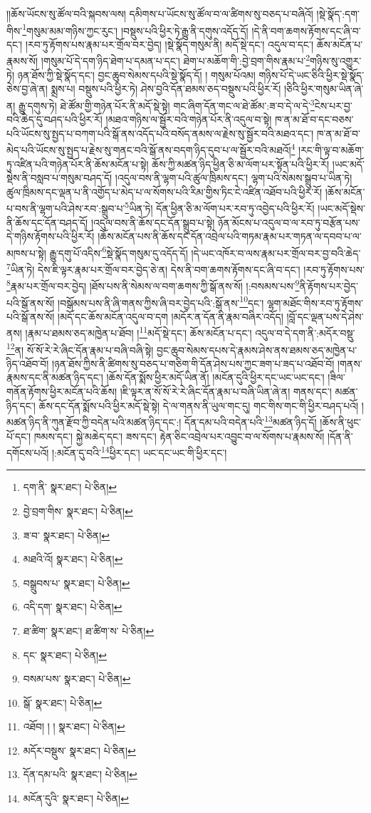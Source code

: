 །།ཆོས་ཡོངས་སུ་ཚོལ་བའི་སྐབས་ལས། དམིགས་པ་ཡོངས་སུ་ཚོལ་བ་ལ་ཚིགས་སུ་བཅད་པ་བཞིའོ། །སྡེ་སྣོད་:དག་གིས་\footnote{དག་ནི་  སྣར་ཐང་།  པེ་ཅིན། }གསུམ་མམ་གཉིས་ཀྱང་རུང་། །བསྡུས་པའི་ཕྱིར་ཏེ་རྒྱུ་ནི་དགུས་འདོད་དོ། །དེ་ནི་བག་ཆགས་རྟོགས་དང་ཞི་བ་དང་། །རབ་ཏུ་རྟོགས་པས་རྣམ་པར་གྲོལ་བར་བྱེད། །སྡེ་སྣོད་གསུམ་ནི། མདོ་སྡེ་དང་། འདུལ་བ་དང་། ཆོས་མངོན་པ་རྣམས་སོ། །གསུམ་པོ་དེ་དག་ཉིད་ཐེག་པ་དམན་པ་དང་། ཐེག་པ་མཆོག་གི་:བྱེ་བྲག་གིས་རྣམ་པ་\footnote{བྱེ་བྲག་གིས་  སྣར་ཐང་།  པེ་ཅིན། }གཉིས་སུ་འགྱུར་ཏེ། ཉན་ཐོས་ཀྱི་སྡེ་སྣོད་དང་། བྱང་ཆུབ་སེམས་དཔའི་སྡེ་སྣོད་དོ། །
གསུམ་པོའམ། གཉིས་པོ་དེ་ཡང་ཅིའི་ཕྱིར་སྡེ་སྣོད་ཅེས་བྱ་ཞེ་ན། སྨྲས་པ། བསྡུས་པའི་ཕྱིར་ཏེ། ཤེས་བྱའི་དོན་ཐམས་ཅད་བསྡུས་པའི་ཕྱིར་རོ། །ཅིའི་ཕྱིར་གསུམ་ཡིན་ཞེ་ན། རྒྱུ་དགུས་ཏེ། ཐེ་ཚོམ་གྱི་གཉེན་པོར་ནི་མདོ་སྡེ་སྟེ། གང་ཞིག་དོན་གང་ལ་ཐེ་ཚོམ་:ཟ་བ་དེ་ལ་དེ་\footnote{ཟ་བ་  སྣར་ཐང་།  པེ་ཅིན། }ངེས་པར་བྱ་བའི་ཆེད་དུ་བཤད་པའི་ཕྱིར་རོ། །མཐའ་གཉིས་ལ་སྦྱོར་བའི་གཉེན་པོར་ནི་འདུལ་བ་སྟེ། ཁ་ན་མ་ཐོ་བ་དང་བཅས་པའི་ཡོངས་སུ་སྤྱད་པ་བཀག་པའི་སྒོ་ནས་འདོད་པའི་བསོད་ནམས་ལ་རྗེས་སུ་སྦྱོར་བའི་མཐའ་དང་། ཁ་ན་མ་ཐོ་བ་མེད་པའི་ཡོངས་སུ་སྤྱད་པ་རྗེས་སུ་གནང་བའི་སྒོ་ནས་བདག་ཉིད་དུབ་པ་ལ་སྦྱོར་བའི་མཐའོ།\footnote{མཐའི་འོ།  སྣར་ཐང་།  པེ་ཅིན། } །རང་གི་ལྟ་བ་མཆོག་ཏུ་འཛིན་པའི་གཉེན་པོར་ནི་ཆོས་མངོན་པ་སྟེ། ཆོས་ཀྱི་མཚན་ཉིད་ཕྱིན་ཅི་མ་ལོག་པར་སྟོན་པའི་ཕྱིར་རོ། །ཡང་མདོ་སྡེས་ནི་བསླབ་པ་གསུམ་བཤད་དོ། །འདུལ་བས་ནི་ལྷག་པའི་ཚུལ་ཁྲིམས་དང་། ལྷག་པའི་སེམས་སྒྲུབ་པ་ཡིན་ཏེ། ཚུལ་ཁྲིམས་དང་ལྡན་པ་ནི་འགྱོད་པ་མེད་པ་ལ་སོགས་པའི་རིམ་གྱིས་ཏིང་ངེ་འཛིན་འཐོབ་པའི་ཕྱིར་རོ། །ཆོས་མངོན་པ་བས་ནི་ལྷག་པའི་ཤེས་རབ་:སྒྲུབ་པ་\footnote{བསྒྲུབས་པ་  སྣར་ཐང་།  པེ་ཅིན། }ཡིན་ཏེ། དོན་ཕྱིན་ཅི་མ་ལོག་པར་རབ་ཏུ་འབྱེད་པའི་ཕྱིར་རོ། །ཡང་མདོ་སྡེས་ནི་ཆོས་དང་དོན་བཤད་དོ། །འདུལ་བས་ནི་ཆོས་དང་དོན་སྒྲུབ་པ་སྟེ། ཉོན་མོངས་པ་འདུལ་བ་ལ་རབ་ཏུ་བརྩོན་པས་དེ་གཉིས་རྟོགས་པའི་ཕྱིར་རོ། །ཆོས་མངོན་པས་ནི་ཆོས་དང་དོན་འབྲེལ་པའི་གཏམ་རྣམ་པར་གཏན་ལ་དབབ་པ་ལ་མཁས་པ་སྟེ། རྒྱུ་དགུ་པོ་འདིས་\footnote{འདི་དག་  སྣར་ཐང་།  པེ་ཅིན། }སྡེ་སྣོད་གསུམ་དུ་འདོད་དོ། །དེ་ཡང་འཁོར་བ་ལས་རྣམ་པར་གྲོལ་བར་བྱ་བའི་ཆེད་\footnote{ཐ་ཚིག་  སྣར་ཐང་། ཐ་ཚིག་ས་  པེ་ཅིན། }ཡིན་ཏེ། དེས་ཇི་ལྟར་རྣམ་པར་གྲོལ་བར་བྱེད་ཅེ་ན། དེས་ནི་བག་ཆགས་རྟོགས་དང་ཞི་བ་དང་། །རབ་ཏུ་རྟོགས་པས་\footnote{དང་  སྣར་ཐང་།  པེ་ཅིན། }རྣམ་པར་གྲོལ་བར་བྱེད། །ཐོས་པས་ནི་སེམས་ལ་བག་ཆགས་ཀྱི་སྒོ་ནས་སོ། །:བསམས་པས་\footnote{བསམ་པས་  སྣར་ཐང་།  པེ་ཅིན། }ནི་རྟོགས་པར་བྱེད་པའི་སྒོ་ནས་སོ། །བསྒོམས་པས་ནི་ཞི་གནས་ཀྱིས་ཞི་བར་བྱེད་པའི་:སྒོ་ནས་\footnote{སྒོ་  སྣར་ཐང་།  པེ་ཅིན། }དང་། ལྷག་མཐོང་གིས་རབ་ཏུ་རྟོགས་པའི་སྒོ་ནས་སོ། །མདོ་དང་ཆོས་མངོན་འདུལ་བ་དག །མདོར་ན་དོན་ནི་རྣམ་བཞིར་འདོད། །བློ་དང་ལྡན་པས་དེ་ཤེས་ནས། །རྣམ་པ་ཐམས་ཅད་མཁྱེན་པ་ཐོབ། །\footnote{འཐོབ། ། །  སྣར་ཐང་།  པེ་ཅིན། }མདོ་སྡེ་དང་། ཆོས་མངོན་པ་དང་། འདུལ་བ་དེ་དག་ནི་:མདོར་བསྡུ་\footnote{མདོར་བསྡུས་  སྣར་ཐང་།  པེ་ཅིན། }ན། སོ་སོ་རེ་རེ་ཞིང་དོན་རྣམ་པ་བཞི་བཞི་སྟེ། བྱང་ཆུབ་སེམས་དཔས་དེ་རྣམས་ཤེས་ནས་ཐམས་ཅད་མཁྱེན་པ་ཉིད་འཐོབ་བོ། །ཉན་ཐོས་ཀྱིས་ནི་ཚིགས་སུ་བཅད་པ་གཅིག་གི་དོན་ཤེས་པས་ཀྱང་ཟག་པ་ཟད་པ་འཐོབ་བོ། །གནས་རྣམས་དང་ནི་མཚན་ཉིད་དང་། །ཆོས་དོན་སྨོས་ཕྱིར་མདོ་ཡིན་ནོ། །མངོན་དུའི་ཕྱིར་དང་ཡང་ཡང་དང་། །ཟིལ་གནོན་རྟོགས་ཕྱིར་མངོན་པའི་ཆོས། །ཇི་ལྟར་ན་སོ་སོ་རེ་རེ་ཞིང་དོན་རྣམ་པ་བཞི་ཡིན་ཞེ་ན། གནས་དང་། མཚན་ཉིད་དང་། ཆོས་དང་དོན་སྨོས་པའི་ཕྱིར་མདོ་སྡེ་སྟེ། དེ་ལ་གནས་ནི་ཡུལ་གང་དུ། གང་གིས་གང་གི་ཕྱིར་བཤད་པའོ། །མཚན་ཉིད་ནི་ཀུན་རྫོབ་ཀྱི་བདེན་པའི་མཚན་ཉིད་དང་:། དོན་དམ་པའི་བདེན་པའི་\footnote{དོན་དམ་པའི་  སྣར་ཐང་།  པེ་ཅིན། }མཚན་ཉིད་དོ། །ཆོས་ནི་ཕུང་པོ་དང་། ཁམས་དང་། སྐྱེ་མཆེད་དང་། ཟས་དང་། རྟེན་ཅིང་འབྲེལ་པར་འབྱུང་བ་ལ་སོགས་པ་རྣམས་སོ། །དོན་ནི་དགོངས་པའོ། །:མངོན་དུ་བའི་\footnote{མངོན་དུའི་  སྣར་ཐང་།  པེ་ཅིན། }ཕྱིར་དང་། ཡང་དང་ཡང་གི་ཕྱིར་དང་། 